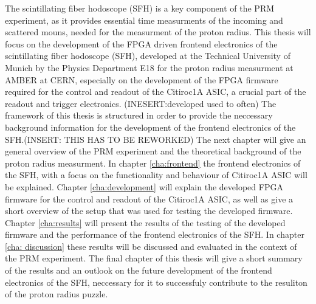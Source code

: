 The scintillating fiber hodoscope (SFH) is a key component of the PRM experiment, as it provides essential time measurments of the incoming and scattered mouns, needed for the measurment of the proton radius.\Autocite{ProposalAmber}
\newline
This thesis will focus on the development of the FPGA driven frontend electronics of the scintillating fiber hodoscope (SFH),
developed at the Technical University of Munich by the Physics Department E18 for the proton radius measurment at AMBER at CERN,
especially on the development of the FPGA firmware required for the control and readout of the Citiroc1A ASIC,
a crucial part of the readout and trigger electronics.
(INESERT:developed used to often)
\newline 
The framework of this thesis is structured in order to provide the neccessary background information for the development of the frontend electronics of the SFH.(INSERT: THIS HAS TO BE REWORKED)
\newline
The next chapter will give an general overview of the PRM experiment and the theoretical background of the proton radius measurment.
\newline 
In chapter \ref{cha:frontend} the frontend electronics of the SFH, with a focus on the functionality and behaviour of Citiroc1A ASIC will be explained.
\newline
Chapter \ref{cha:development} will explain the developed FPGA firmware for the control and readout of the Citiroc1A ASIC, as well as give a short overview of the setup that was used for testing the developed firmware.
\newline
Chapter \ref{cha:results} will present the results of the testing of the developed firmware and the performance of the frontend electronics of the SFH.
\newline
In chapter \ref{cha: discussion} these results will be discussed and evaluated in the context of the PRM experiment.
\newline 
The final chapter of this thesis will give a short summary of the results and an outlook on the future development of the frontend electronics of the SFH,
neccessary for it to successfuly contribute to the resuliton of the proton radius puzzle.



 
